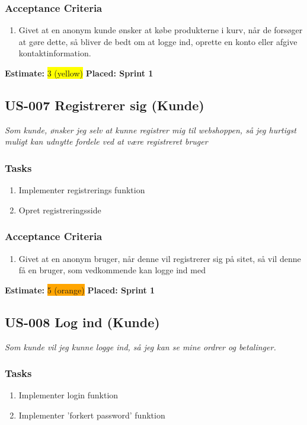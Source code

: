 \subsubsection*{\textbf{Acceptance Criteria}}
\begin{enumerate}
  \item Givet at en anonym kunde ønsker at købe produkterne i kurv, når de forsøger at gøre dette, så bliver de bedt om at logge ind, oprette en konto eller afgive kontaktinformation.
\end{enumerate}
\textbf{Estimate:} \colorbox{yellow}{3 (yellow)}
\textbf{Placed: Sprint 1}
\par\noindent\dotfill

\subsection{US-007 Registrerer sig (Kunde)}
\label{sec:US-007}
\textit{Som kunde, ønsker jeg selv at kunne registrer mig til webshoppen, så jeg hurtigst muligt kan udnytte fordele ved at være registreret bruger}
\subsubsection*{\textbf{Tasks}}
\begin{enumerate}
  \item Implementer registrerings funktion
  \item Opret registreringsside
\end{enumerate}
\subsubsection*{\textbf{Acceptance Criteria}}
\begin{enumerate}
  \item Givet at en anonym bruger, når denne vil registrerer sig på sitet, så vil denne få en bruger, som vedkommende kan logge ind med
\end{enumerate}
\textbf{Estimate:} \colorbox{orange}{5 (orange)}
\textbf{Placed: Sprint 1}
\par\noindent\dotfill

\subsection{US-008 Log ind (Kunde)}
\label{sec:US-008}
\textit{Som kunde vil jeg kunne logge ind, så jeg kan se mine ordrer og betalinger.}
\subsubsection*{\textbf{Tasks}}
\begin{enumerate}
  \item Implementer login funktion
  \item Implementer 'forkert password' funktion
\end{enumerate}
